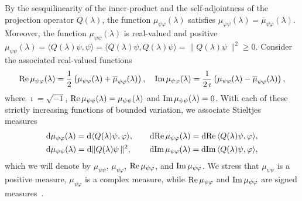 \documentclass[amsa]{ipart}
\begin{document}
By the sesquilinearity of the
inner-product and the self-adjointness of the projection operator
$Q(\lambda)$, the function $\mu_{\psi\varphi}(\lambda)$ satisfies
$\mu_{\varphi\psi}(\lambda)=\overline{\mu}_{\psi\varphi}(\lambda)$. Moreover, the function $\mu_{\psi\psi}(\lambda)$
is real-valued and positive
$\mu_{\psi\psi}(\lambda)=\langle Q(\lambda)\psi,\psi\rangle=\langle Q(\lambda)\psi,Q(\lambda)\psi\rangle=\|Q(\lambda)\psi\,\|^2\geq0$. 
Consider the associated real-valued functions   
%
\begin{align}\label{eq:Fns_Bounded_Var}
  \Real\mu_{\psi\varphi}(\lambda)
         =\frac{1}{2}\left(\mu_{\psi\varphi}(\lambda)+\overline{\mu}_{\psi\varphi}(\lambda)\right), \quad
  \Imag\mu_{\psi\varphi}(\lambda)
         =\frac{1}{2\,\imath}\left(\mu_{\psi\varphi}(\lambda)-\overline{\mu}_{\psi\varphi}(\lambda)\right),
\end{align}
%
where $\imath=\sqrt{-1}$, $\mbox{Re}\,\mu_{\psi\psi}(\lambda)=\mu_{\psi\psi}(\lambda)$ and
$\mbox{Im}\,\mu_{\psi\psi}(\lambda)=0$. With each of these strictly increasing functions
of bounded variation, we associate Stieltjes
measures~\cite{Stieltjes:1995,Stone:64,Folland:99:RealAnalysis}  
%
\begin{align}\label{eq:Bounded_Variation}
  &\d\mu_{\psi\varphi}(\lambda)=\d\langle Q(\lambda)\psi,\varphi\rangle, \qquad
  \d\Real\mu_{\psi\varphi}(\lambda)=\d\Real\langle Q(\lambda)\psi,\varphi\rangle,\\  
  &\d\mu_{\psi\psi}(\lambda)=\d\|Q(\lambda)\psi\,\|^2, \qquad
  \hspace{0.2em}
  \d\Imag\mu_{\psi\varphi}(\lambda)=\d\Imag\langle Q(\lambda)\psi,\varphi\rangle,
  \notag
\end{align}
%
which we will denote by $\mu_{\psi\psi}$, $\mu_{\psi\varphi}$, $\mbox{Re}\,\mu_{\psi\varphi}$, and
$\mbox{Im}\,\mu_{\psi\varphi}$. We stress that $\mu_{\psi\psi}$ is a positive measure, $\mu_{\psi\varphi}$
is a complex measure, while $\mbox{Re}\,\mu_{\psi\varphi}$ and $\mbox{Im}\,\mu_{\psi\varphi}$ are signed
measures~\cite{Stieltjes:1995,Stone:64}.  
\end{document}
